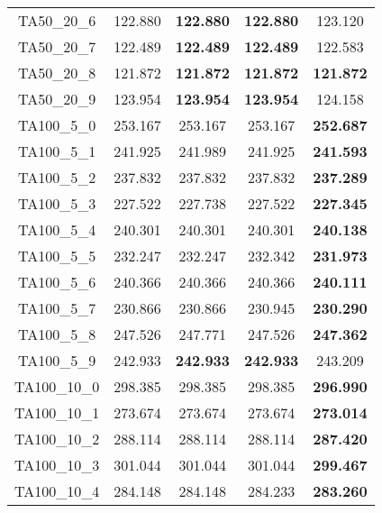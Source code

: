 \begin{tabular}{cc|cc|c}
TA50\_20\_6        & 122.880          & {\bf 122.880}    & {\bf 122.880}    & 123.120         \\ 
TA50\_20\_7        & 122.489          & {\bf 122.489}    & {\bf 122.489}    & 122.583         \\ 
TA50\_20\_8        & 121.872          & {\bf 121.872}    & {\bf 121.872}    & {\bf 121.872}   \\ 
TA50\_20\_9        & 123.954          & {\bf 123.954}    & {\bf 123.954}    & 124.158         \\ 
TA100\_5\_0        & 253.167          & 253.167          & 253.167          & {\bf 252.687}   \\ 
TA100\_5\_1        & 241.925          & 241.989          & 241.925          & {\bf 241.593}   \\ 
TA100\_5\_2        & 237.832          & 237.832          & 237.832          & {\bf 237.289}   \\ 
TA100\_5\_3        & 227.522          & 227.738          & 227.522          & {\bf 227.345}   \\ 
TA100\_5\_4        & 240.301          & 240.301          & 240.301          & {\bf 240.138}   \\ 
TA100\_5\_5        & 232.247          & 232.247          & 232.342          & {\bf 231.973}   \\ 
TA100\_5\_6        & 240.366          & 240.366          & 240.366          & {\bf 240.111}   \\ 
TA100\_5\_7        & 230.866          & 230.866          & 230.945          & {\bf 230.290}   \\ 
TA100\_5\_8        & 247.526          & 247.771          & 247.526          & {\bf 247.362}   \\ 
TA100\_5\_9        & 242.933          & {\bf 242.933}    & {\bf 242.933}    & 243.209         \\ 
TA100\_10\_0       & 298.385          & 298.385          & 298.385          & {\bf 296.990}   \\ 
TA100\_10\_1       & 273.674          & 273.674          & 273.674          & {\bf 273.014}   \\ 
TA100\_10\_2       & 288.114          & 288.114          & 288.114          & {\bf 287.420}   \\ 
TA100\_10\_3       & 301.044          & 301.044          & 301.044          & {\bf 299.467}   \\ 
TA100\_10\_4       & 284.148          & 284.148          & 284.233          & {\bf 283.260}   \\ 

\end{tabular}
